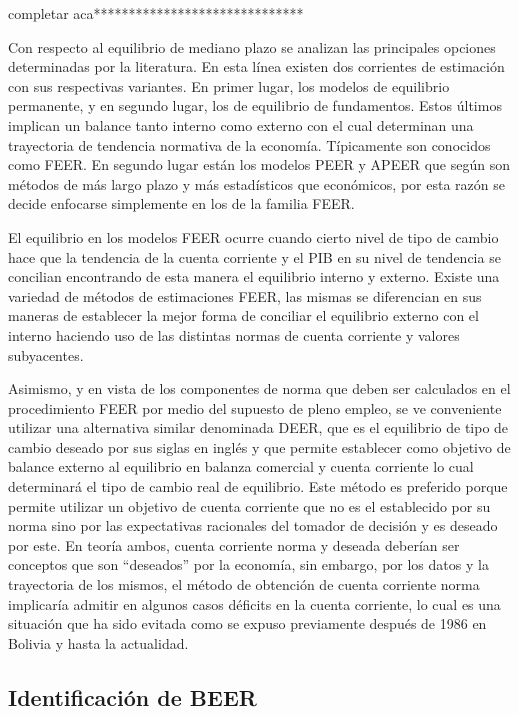 \documentclass[12pt,letterpaper]{article}
\begin{document}
completar aca******************************

Con respecto al equilibrio de mediano plazo se analizan las principales opciones determinadas por la literatura. En esta línea existen dos corrientes de estimación con sus respectivas variantes. En primer lugar, los modelos de equilibrio permanente, y en segundo lugar, los de equilibrio de fundamentos. Estos últimos implican un balance tanto interno como externo con el cual determinan una trayectoria de tendencia normativa de la economía. Típicamente son conocidos como FEER. En segundo lugar están los modelos PEER y APEER que según \cite{driver2005concepts} son métodos de más largo plazo y más estadísticos que económicos, por esta razón se decide enfocarse simplemente en los de la familia FEER.

El equilibrio en los modelos FEER ocurre cuando cierto nivel de tipo de cambio hace que la tendencia de la cuenta corriente y el PIB en su nivel de tendencia se concilian encontrando de esta manera el equilibrio interno y externo. Existe una variedad de métodos de estimaciones FEER, las mismas se diferencian en sus maneras de establecer la mejor forma de conciliar el equilibrio externo con el interno haciendo uso de las distintas normas de cuenta corriente y valores subyacentes.

Asimismo, y en vista de los componentes de norma que deben ser calculados en el procedimiento FEER por medio del supuesto de pleno empleo, se ve conveniente utilizar una alternativa similar denominada DEER, que es el equilibrio de tipo de cambio deseado por sus siglas en inglés y que permite establecer como objetivo de balance externo al equilibrio en balanza comercial y cuenta corriente lo cual determinará el tipo de cambio real de equilibrio. Este método es preferido porque permite utilizar un objetivo de cuenta corriente que no es el establecido por su norma sino por las expectativas racionales del tomador de decisión y es deseado por este. En teoría ambos, cuenta corriente norma y deseada deberían ser conceptos que son ``deseados'' por la economía, sin embargo, por los datos y la trayectoria de los mismos, el método de obtención de cuenta corriente norma implicaría admitir en algunos casos déficits en la cuenta corriente, lo cual es una situación que ha sido evitada como se expuso previamente después de 1986 en Bolivia y hasta la actualidad.


\subsection{Identificación de BEER}
\end{document}
